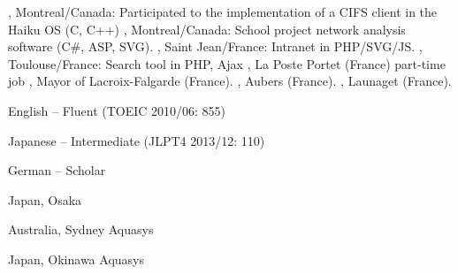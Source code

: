 \documentclass[english]{ecv}
\makeatletter
\renewcommand{\ecvBSec}[2][\ecv@lang]{%
  \ifthenelse{\equal{#1}{\ecv@lang}}{%
    \tabularnewline%
    \ecvLeft{\textsc{\Large{\textcolor{ecv@ColBlue}{#2}}} \medskip } &%
    \tabularnewline%
  }{}%
}
\makeatother
\begin{document}
\begin{ecv}
                 {, Montreal/Canada: Participated
                  to the implementation of a CIFS client in the Haiku OS (C, C++)
                 }
                 {, Montreal/Canada:
                 School project network analysis software (C\#, ASP, SVG).
                 }
                 {, Saint Jean/France: Intranet in PHP/SVG/JS.
                 }
                 {, Toulouse/France:
                 Search tool in PHP, Ajax
                 }
 {, La Poste Portet (France) part-time job}
 {, Mayor of Lacroix-Falgarde (France).}
 {, Aubers (France).}
 {, Launaget (France).}


\ecvBSec{\hypertarget{hypertarget:\ecvLanguages}{\ecvLanguages}}


 {
  \begin{description}
    \begin{spacing}{-1}
    \item[English] -- Fluent (TOEIC 2010/06: 855)
    \item[Japanese] -- Intermediate (JLPT4 2013/12: 110)
    \item[German] -- Scholar
    \end{spacing}
  \end{description}
}

\ecvBSub{\ecvLanguageTravels}

 {Japan, Osaka}

 {Australia, Sydney}
                {Aquasys}

 {Japan, Okinawa}
                {Aquasys}


\end{ecv}
\end{document}

